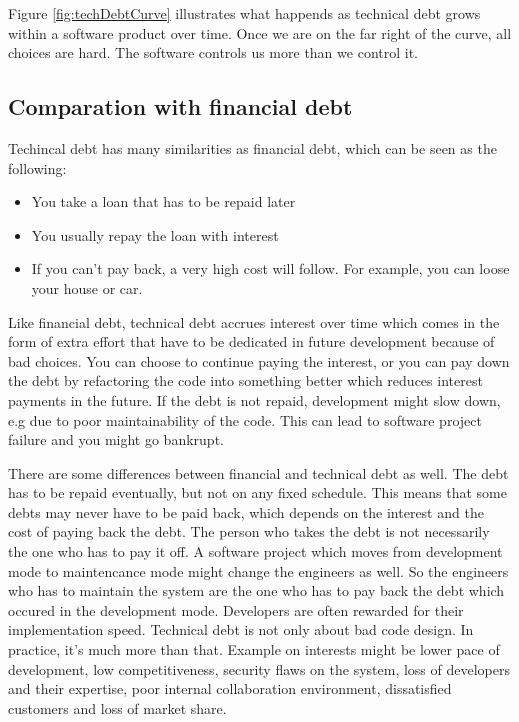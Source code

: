 Figure \ref{fig:techDebtCurve} illustrates what happends as technical debt grows within a software product over time. Once we are on the far right of the curve, all choices are hard. The software controls us more than we control it.


\subsection{Comparation with financial debt}
Techincal debt has many similarities as financial debt\cite{p50-allman,Zazworka:2011:PDD:1985362.1985372}, which can be seen as the following:
\begin{itemize}
	\item You take a loan that has to be repaid later
	\item You usually repay the loan with interest
	\item If you can't pay back, a very high cost will follow. For example, you can loose your house or car.
\end{itemize}

Like financial debt, technical debt accrues interest over time which comes in the form of extra effort that have to be dedicated in future development because of bad choices\cite{p31-guo,p35-klinger}. You can choose to continue paying the interest, or you can pay down the debt by refactoring the code into something better which reduces interest payments in the future\cite{url-fowler}. If the debt is not repaid, development might slow down, e.g due to poor maintainability of the code. This can lead to software project failure and you might go bankrupt\cite{p50-allman}. 

There are some differences between financial and technical debt as well. The debt has to be repaid eventually, but not on any fixed schedule\cite{p50-allman}. This means that some debts may never have to be paid back, which depends on the interest and the cost of paying back the debt. The person who takes the debt is not necessarily the one who has to pay it off. A software project which moves from development mode to maintencance mode might change the engineers as well. So the engineers who has to maintain the system are the one who has to pay back the debt which occured in the development mode. Developers are often rewarded for their implementation speed. 
Technical debt is not only about bad code design. In practice, it's much more than that. Example on interests might be lower pace of development, low competitiveness, security flaws on the system, loss of developers and their expertise, poor internal collaboration environment, dissatisfied customers and loss of market share\cite{p50-allman}.

